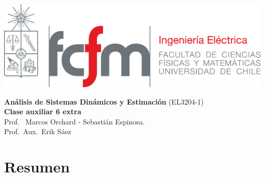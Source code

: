 \documentclass[
  11pt,
  letterpaper,
   addpoints,
  answers
  ]{exam}
\begin{document}
\pagestyle{plain}

\noindent
\begin{minipage}{0.47\textwidth}
\includegraphics[width=\textwidth]{../fcfm_die}
\end{minipage}
\begin{minipage}{0.53\textwidth}
\begin{center} 
\large\textbf{Análisis de Sistemas Dinámicos y Estimación} (EL3204-1) \\
\large\textbf{Clase auxiliar 6 extra} \\
\normalsize Prof.~ Marcos Orchard - Sebastián Espinosa.\\
\normalsize Prof.~Aux.~Erik Sáez
\end{center}
\end{minipage}

\vspace{0.5cm}
\noindent
\vspace{.85cm}
\section*{Resumen}
\end{document}

